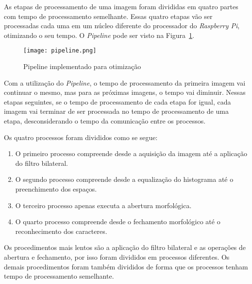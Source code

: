 As etapas de processamento de uma imagem foram divididas em quatro partes com
tempo de processamento semelhante. Essas quatro etapas vão ser processadas cada
uma em um núcleo diferente do processador do \emph{Raspberry Pi}, otimizando o
seu tempo. O \emph{Pipeline} pode ser visto na Figura~\ref{fig:pipeline}.

\begin{figure}[H]
	\centering
	\texttt{[image: pipeline.png]}
	\caption{Pipeline implementado para otimização}
	\label{fig:pipeline}
\end{figure}

Com a utilização do \emph{Pipeline}, o tempo de processamento da primeira imagem
vai continuar o mesmo, mas para as próximas imagens, o tempo vai diminuir.
Nessas etapas seguintes, se o tempo de processamento de cada etapa for igual,
cada imagem vai terminar de ser processada no tempo de processamento de uma
etapa, desconsiderando o tempo da comunicação entre os processos.

Os quatro processos foram divididos como se segue:

\begin{enumerate}
	\item O primeiro processo compreende desde a aquisição da imagem até a aplicação do filtro bilateral.
	\item O segundo processo compreende desde a equalização do histograma até o preenchimento dos espaços.
	\item O terceiro processo apenas executa a abertura morfológica.
	\item O quarto processo compreende desde o fechamento morfológico até o reconhecimento dos caracteres.
\end{enumerate}

Os procedimentos mais lentos são a aplicação do filtro bilateral e as operações
de abertura e fechamento, por isso foram divididos em processos diferentes. Os
demais procedimentos foram também divididos de forma que os processos tenham
tempo de processamento semelhante.


